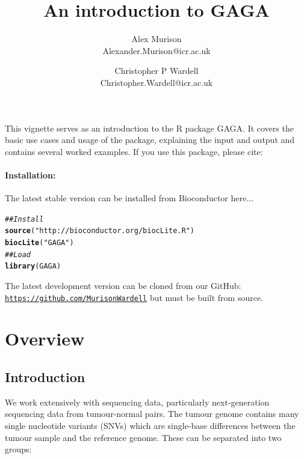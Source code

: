 \documentclass[a4paper]{article}\usepackage[]{graphicx}\usepackage[]{color}
\makeatletter
\newcommand{\hlstr}[1]{\textcolor[rgb]{0.192,0.494,0.8}{#1}}%
\newcommand{\hlcom}[1]{\textcolor[rgb]{0.678,0.584,0.686}{\textit{#1}}}%
\newcommand{\hlstd}[1]{\textcolor[rgb]{0.345,0.345,0.345}{#1}}%
\newcommand{\hlkwd}[1]{\textcolor[rgb]{0.737,0.353,0.396}{\textbf{#1}}}%
\newenvironment{kframe}{%
 \def\at@end@of@kframe{}%
 \ifinner\ifhmode%
  \def\at@end@of@kframe{\end{minipage}}%
  \begin{minipage}{\columnwidth}%
 \fi\fi%
 \def\FrameCommand##1{\hskip\@totalleftmargin \hskip-\fboxsep
 \colorbox{shadecolor}{##1}\hskip-\fboxsep
     \hskip-\linewidth \hskip-\@totalleftmargin \hskip\columnwidth}%
 \MakeFramed {\advance\hsize-\width
   \@totalleftmargin\z@ \linewidth\hsize
   \@setminipage}}%
 {\par\unskip\endMakeFramed%
 \at@end@of@kframe}
\newenvironment{knitrout}{}{} %
\makeatother
\begin{document}
\title{An introduction to GAGA}
\author{
  Alex Murison\\
  Alexander.Murison@icr.ac.uk
  \and
  Christopher P Wardell\\
  Christopher.Wardell@icr.ac.uk
}
\maketitle

This vignette serves as an introduction to the R package GAGA.  It covers the basic use cases and usage of the package, explaining the input and output and contains several worked examples.  If you use this package, please cite:

\cite{yeast}

\paragraph{Installation:} The latest stable version can be installed from Bioconductor here...
 
\begin{knitrout}
\color{fgcolor}\begin{kframe}
\begin{alltt}
\hlcom{## Install}
\hlkwd{source}\hlstd{(}\hlstr{"http://bioconductor.org/biocLite.R"}\hlstd{)}
\hlkwd{biocLite}\hlstd{(}\hlstr{"GAGA"}\hlstd{)}
\hlcom{## Load}
\hlkwd{library}\hlstd{(GAGA)}
\end{alltt}
\end{kframe}
\end{knitrout}


The latest development version can be cloned from our GitHub:\\ \texttt{\href{https://github.com/MurisonWardell}{https://github.com/MurisonWardell}} but must be built from source.

\pagebreak
\tableofcontents
\pagebreak

\section{Overview}
\subsection{Introduction}
We work extensively with sequencing data, particularly next-generation sequencing data from tumour-normal pairs.  The tumour genome contains many single nucleotide variants (SNVs) which are single-base differences between the tumour sample and the reference genome.  These can be separated into two groups:
\end{document}
